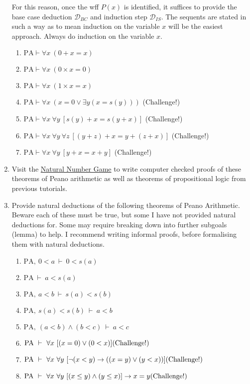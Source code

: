 \documentclass[11pt]{report}
\newcommand{\PA}{\text{PA}}
\begin{document}
\begin{enumerate}
	For this reason, once the wff $P(x)$ is identified, it suffices to provide the base case deduction $\mathcal{D}_{BC}$ and induction step $\mathcal{D}_{IS}$. The sequents are stated in such a way as to mean induction on the variable $x$ will be the easiest approach. Always do induction on the variable $x$.  
	
	\begin{enumerate}
		\item $\text{PA} \vdash \forall x \ (0 + x = x)$
		\item $\text{PA} \vdash \forall x \ (0 \times x = 0)$
		\item $\text{PA} \vdash \forall x \ (1 \times x = x)$
		\item $\text{PA} \vdash \forall x \ (x = 0 \lor \exists y (x = s(y)))$ \hfill (Challenge!)
		\item $\text{PA} \vdash \forall x \ \forall y \ [s(y) + x = s(y+x)]$ \hfill (Challenge!)
		\item $\text{PA} \vdash \forall x \ \forall y \ \forall z \ [(y + z) + x = y + (z + x)]$ \hfill (Challenge!)
		\item $\text{PA} \vdash \forall x \ \forall y \ [y + x = x + y]$ \hfill (Challenge!)
	\end{enumerate}

	\item Visit the \href{https://adam.math.hhu.de/\#/g/leanprover-community/nng4}{Natural Number Game} to write computer checked proofs of these theorems of Peano arithmetic as well as theorems of propositional logic from previous tutorials. 
	 
	\item Provide natural deductions of the following theorems of Peano Arithmetic. Beware each of these must be true, but some I have not provided natural deductions for. Some may require breaking down into further subgoals (lemma) to help. I recommend writing informal proofs, before formalising them with natural deductions.
	
		\begin{enumerate}
			\item $\PA , \ 0 < a \ \vdash \ 0 < s(a)$
			\item $\PA \ \vdash \ a < s(a)$
			\item $\PA , \ a < b \ \vdash \ s(a) < s(b)$
			\item $\PA , \ s(a) < s(b) \ \vdash \ a < b$
			\item $\PA , \ (a < b) \land (b < c) \ \vdash \ a < c$
			\item $\PA \ \vdash \ \forall x \ [(x = 0) \lor (0 < x)] \hfill \text{(Challenge!)}$
			\item $\PA \ \vdash \ \forall x \ \forall y \ [\lnot(x<y) \to ((x=y) \lor (y<x))] \hfill \text{(Challenge!)}$
			\item $\PA \ \vdash \ \forall x \ \forall y \ [(x\leq y) \land (y\leq x)] \to x=y \hfill \text{(Challenge!)}$
		\end{enumerate}
	 
\end{enumerate}	
\end{document}
